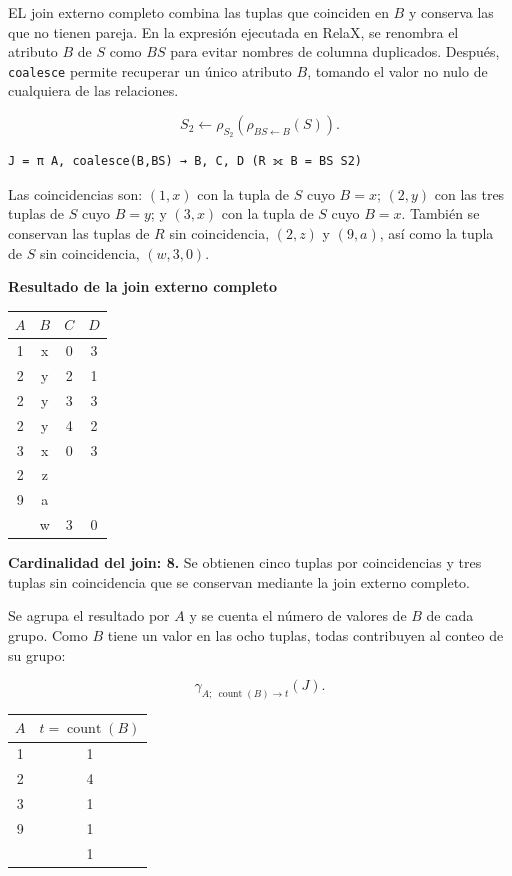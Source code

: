 EL join externo completo combina las tuplas que coinciden en $B$ y conserva las que no tienen pareja. En la expresión ejecutada en RelaX, se renombra el atributo $B$ de $S$ como $BS$ para evitar nombres de columna duplicados. Después, \texttt{coalesce} permite recuperar un único atributo $B$, tomando el valor no nulo de cualquiera de las relaciones.

\[
S_2\leftarrow\rho_{S_2}(\rho_{BS\leftarrow B}(S)).
\]

\begin{lstlisting}
J = π A, coalesce(B,BS) → B, C, D (R ⟗ B = BS S2)
\end{lstlisting}


Las coincidencias son: $(1,x)$ con la tupla de $S$ cuyo $B=x$; $(2,y)$ con las tres tuplas de $S$ cuyo $B=y$; y $(3,x)$ con la tupla de $S$ cuyo $B=x$. También se conservan las tuplas de $R$ sin coincidencia, $(2,z)$ y $(9,a)$, así como la tupla de $S$ sin coincidencia, $(w,3,0)$.

\textbf{Resultado de la join externo completo}

\begin{center}
\small
\begin{tabular}{cccc}
\toprule
\rowcolor{Fondo}
$A$ & $B$ & $C$ & $D$\\
\midrule
1 & x & 0 & 3\\
2 & y & 2 & 1\\
2 & y & 3 & 3\\
2 & y & 4 & 2\\
3 & x & 0 & 3\\
2 & z & \nulo{} & \nulo{}\\
9 & a & \nulo{} & \nulo{}\\
\nulo{} & w & 3 & 0\\
\bottomrule
\end{tabular}
\end{center}

\textbf{Cardinalidad del join: 8.} Se obtienen cinco tuplas por coincidencias y tres tuplas sin coincidencia que se conservan mediante la join externo completo.

Se agrupa el resultado por $A$ y se cuenta el número de valores de $B$ de cada grupo. Como $B$ tiene un valor en las ocho tuplas, todas contribuyen al conteo de su grupo:

\[
\gamma_{A;\ \operatorname{count}(B)\to t}(J).
\]

\begin{center}
\begin{tabular}{cc}
\toprule
\rowcolor{Fondo}
$A$ & $t=\operatorname{count}(B)$\\
\midrule
1 & 1\\
2 & 4\\
3 & 1\\
9 & 1\\
\nulo{} & 1\\
\bottomrule
\end{tabular}
\end{center}


